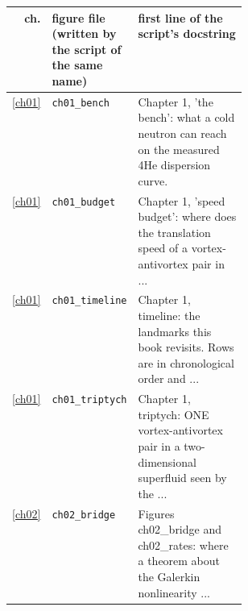 \begin{center}\footnotesize\setlength{\tabcolsep}{3pt}\begin{tabularx}{\linewidth}{@{}r>{\raggedright}p{0.34\linewidth}>{\raggedright\arraybackslash}X@{}}\toprule ch. & figure file (written by the script of the same name) & first line of the script's docstring\\\midrule
\ref{ch01} & \texttt{ch01\_\allowbreak{}bench} & Chapter 1,\allowbreak{} 'the bench': what a cold neutron can reach on the measured 4He dispersion curve.\allowbreak{} \\
\ref{ch01} & \texttt{ch01\_\allowbreak{}budget} & Chapter 1,\allowbreak{} 'speed budget': where does the translation speed of a vortex-\allowbreak{}antivortex pair in .\allowbreak{}.\allowbreak{}.\allowbreak{} \\
\ref{ch01} & \texttt{ch01\_\allowbreak{}timeline} & Chapter 1,\allowbreak{} timeline: the landmarks this book revisits.\allowbreak{}  Rows are in chronological order and .\allowbreak{}.\allowbreak{}.\allowbreak{} \\
\ref{ch01} & \texttt{ch01\_\allowbreak{}triptych} & Chapter 1,\allowbreak{} triptych: ONE vortex-\allowbreak{}antivortex pair in a two-\allowbreak{}dimensional superfluid seen by the .\allowbreak{}.\allowbreak{}.\allowbreak{} \\
\ref{ch02} & \texttt{ch02\_\allowbreak{}bridge} & Figures ch02\_\allowbreak{}bridge and ch02\_\allowbreak{}rates: where a theorem about the Galerkin nonlinearity .\allowbreak{}.\allowbreak{}.\allowbreak{} \\
\bottomrule\end{tabularx}\end{center}
